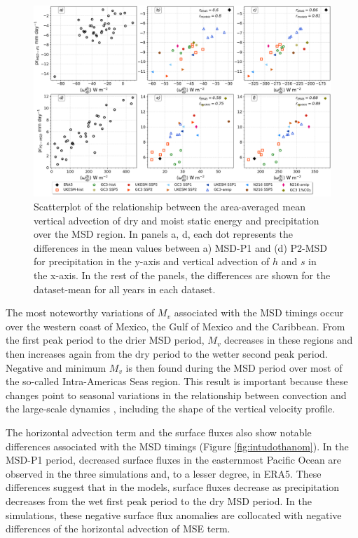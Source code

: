 \begin{figure}[t!]
\includegraphics[width=\linewidth]{figures/thermo_scatter}
\caption[Scatterplot of the vertical advection of dry and moist static energy against precipitation]{Scatterplot of the relationship between the area-averaged mean vertical advection of dry and moist static energy and precipitation over the MSD region. In panels a, d, each dot represents the differences in the mean values between a) MSD-P1 and (d) P2-MSD for precipitation in the y-axis and vertical advection of $h$ and $s$ in the x-axis. In the rest of the panels, the differences are shown for the dataset-mean for all years in each dataset.    }
\label{fig:thermo_scatter}
\end{figure}

 The most noteworthy variations of $M_v$ associated with the MSD timings occur over the western coast of  Mexico, the Gulf of Mexico and the Caribbean. From the first peak period to the drier MSD period, $M_v$ decreases in these regions and then increases again from the dry period to the wetter second peak period. Negative and minimum $M_v$ is then found during the MSD period over most of the so-called Intra-Americas Seas region. This result is important because these changes point to seasonal variations in the relationship between convection and the large-scale dynamics \citep{raymond2009}, including the shape of the vertical velocity profile.

The horizontal advection term and the surface fluxes also show notable differences associated with the MSD timings (Figure \ref{fig:intudothanom}). In the MSD-P1 period, decreased surface fluxes in the easternmost Pacific Ocean are observed in the three simulations and, to a lesser degree, in ERA5. These differences suggest that in the models, surface fluxes decrease as precipitation decreases from the wet first peak period to the dry MSD period. In the simulations, these negative surface flux anomalies are collocated with negative differences of the horizontal advection of MSE term. 

